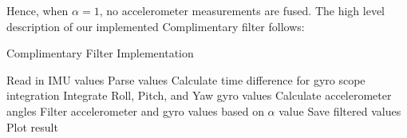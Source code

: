 \documentclass{article}
\numberwithin{equation}{section} %
\numberwithin{figure}{section} %
\numberwithin{table}{section} %
\begin{document}
\begin{framed}
Hence, when $\alpha=1$, no accelerometer measurements are fused.  The high level description of our implemented Complimentary filter follows:

\begin{algorithm}[H]
\caption{Complimentary Filter Implementation}\label{alg:cap}
\begin{algorithmic}[1] %
\State Read in IMU values
\State Parse values
\State Calculate time difference for gyro scope integration
\State Integrate Roll, Pitch, and Yaw gyro values
\State Calculate accelerometer angles
\State Filter accelerometer and gyro values based on $\alpha$ value
\State Save filtered values
\EndWhile
\State Plot result
\end{algorithmic}
\end{algorithm}



\end{framed}
\end{document}
